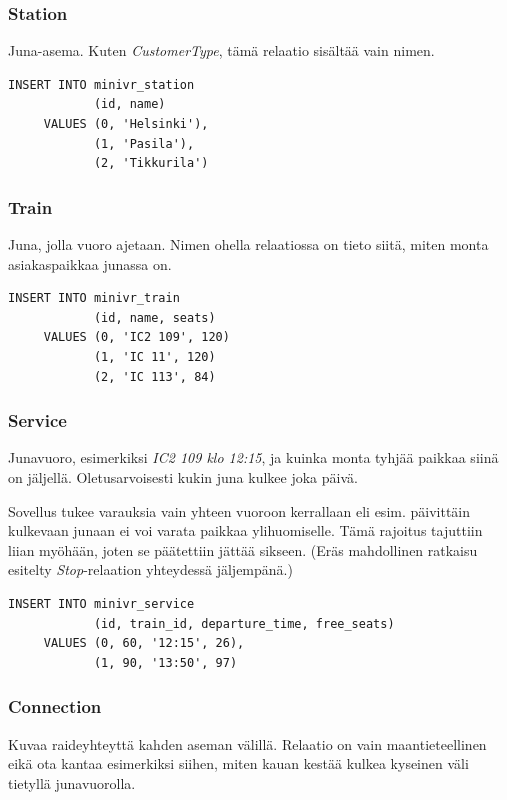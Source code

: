 \documentclass[a4paper,twoside,titlepage,12pt]{article}
\begin{document}
\subsubsection{Station}

Juna-asema. Kuten \emph{CustomerType}, tämä relaatio sisältää vain nimen.

\begin{lstlisting}
INSERT INTO minivr_station
            (id, name)
     VALUES (0, 'Helsinki'),
            (1, 'Pasila'),
            (2, 'Tikkurila')
\end{lstlisting}

\subsubsection{Train}

Juna, jolla vuoro ajetaan. Nimen ohella relaatiossa on tieto siitä, miten monta
asiakaspaikkaa junassa on.

\begin{lstlisting}
INSERT INTO minivr_train
            (id, name, seats)
     VALUES (0, 'IC2 109', 120)
            (1, 'IC 11', 120)
            (2, 'IC 113', 84)
\end{lstlisting}

\subsubsection{Service}

Junavuoro, esimerkiksi \emph{IC2 109 klo 12:15}, ja kuinka monta tyhjää paikkaa
siinä on jäljellä. Oletusarvoisesti kukin juna kulkee joka päivä.

Sovellus tukee varauksia vain yhteen vuoroon kerrallaan eli esim. päivittäin
kulkevaan junaan ei voi varata paikkaa ylihuomiselle. Tämä rajoitus tajuttiin
liian myöhään, joten se päätettiin jättää sikseen. (Eräs mahdollinen ratkaisu
esitelty \emph{Stop}-relaation yhteydessä jäljempänä.)

\begin{lstlisting}
INSERT INTO minivr_service
            (id, train_id, departure_time, free_seats)
     VALUES (0, 60, '12:15', 26),
            (1, 90, '13:50', 97)
\end{lstlisting}

\subsubsection{Connection}

Kuvaa raideyhteyttä kahden aseman välillä. Relaatio on vain maantieteellinen
eikä ota kantaa esimerkiksi siihen, miten kauan kestää kulkea kyseinen väli
tietyllä junavuorolla.
\end{document}

